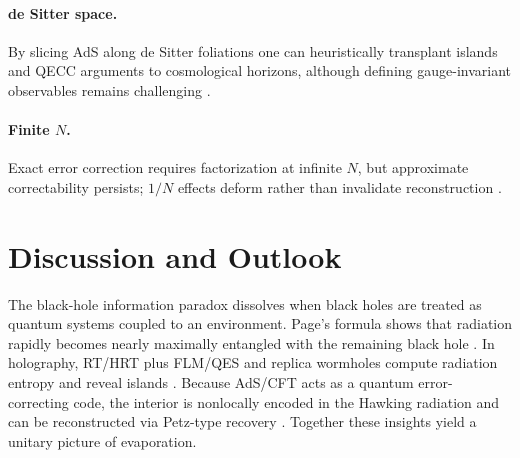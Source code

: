 \documentclass[12pt, numbers, sort&compress]{article}
\begin{document}
\paragraph{de Sitter space.}
By slicing AdS along de Sitter foliations one can heuristically transplant islands and QECC arguments to cosmological horizons, although defining gauge-invariant observables remains challenging \cite{Akers:2023dSislands}.

\paragraph{Finite $N$.}
Exact error correction requires factorization at infinite $N$, but approximate correctability persists; $1/N$ effects deform rather than invalidate reconstruction \cite{Hayden:2024approximate}.

\section{Discussion and Outlook}
The black-hole information paradox dissolves when black holes are treated as quantum systems coupled to an environment. Page’s formula shows that radiation rapidly becomes nearly maximally entangled with the remaining black hole \cite{Page:1993prl}. In holography, RT/HRT plus FLM/QES and replica wormholes compute radiation entropy and reveal islands \cite{Ryu:2006prl,Faulkner:2013FLM,EngelhardtWall:2015QES,SciPost:2020islands,Penington:2023replica}. Because AdS/CFT acts as a quantum error-correcting code, the interior is nonlocally encoded in the Hawking radiation and can be reconstructed via Petz-type recovery \cite{ADH:2015,JLMS:2016,Penington:2019petz}. Together these insights yield a unitary picture of evaporation.
\end{document}
